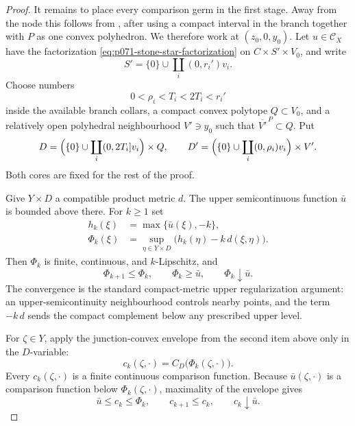 \begin{proof}
It remains to place every comparison germ in the first stage.  Away from
the node this follows from
, after using a compact interval
in the branch together with \(P\) as one convex polyhedron.  We therefore
work at \((z_0,0,y_0)\).  Let \(u\in\mathcal C_X\) have the factorization
\eqref{eq:p071-stone-star-factorization} on
\(C\times S'\times V_0\), and write
\[
                  S'=\{0\}\cup\coprod_i(0,r_i')v_i.
\]
Choose numbers
\[
                   0<\rho_i<T_i<2T_i<r_i'
\]
inside the available branch collars, a compact convex polytope
\(Q\subset V_0\), and a relatively open polyhedral neighbourhood
\(V'\ni y_0\) such that \(\overline{V'}^{\,P}\subset Q\).  Put
\begin{equation}
 D=\Bigl(\{0\}\cup\coprod_i(0,2T_i]v_i\Bigr)\times Q,
 \qquad
 D'=\Bigl(\{0\}\cup\coprod_i(0,\rho_i)v_i\Bigr)\times V'.
 \label{eq:p071-stone-star-nested-cores}
\end{equation}
Both cores are fixed for the rest of the proof.

Give \(Y\times D\) a compatible product metric \(d\).  The upper
semicontinuous function \(\bar u\) is bounded above there.  For \(k\geq1\)
set
\begin{align}
 h_k(\xi)&=\max\{\bar u(\xi),-k\},\\
 \Phi_k(\xi)&=\sup_{\eta\in Y\times D}
                 \bigl(h_k(\eta)-k\,d(\xi,\eta)\bigr).
 \label{eq:p071-stone-star-usc-regularization}
\end{align}
Then \(\Phi_k\) is finite, continuous, and \(k\)-Lipschitz, and
\begin{equation}
               \Phi_{k+1}\leq\Phi_k,
        \qquad \Phi_k\geq\bar u,
        \qquad \Phi_k\downarrow\bar u.
 \label{eq:p071-stone-star-usc-convergence}
\end{equation}
The convergence is the standard compact-metric upper regularization
argument: an upper-semicontinuity neighbourhood controls nearby points,
and the term \(-k\,d\) sends the compact complement below any prescribed
upper level.

For \(\zeta\in Y\), apply the junction-convex envelope from the second
item above only in the \(D\)-variable:
\begin{equation}
                    c_k(\zeta,\cdot)
          =C_D\bigl(\Phi_k(\zeta,\cdot)\bigr).
 \label{eq:p071-stone-star-fibre-envelope}
\end{equation}
Every \(c_k(\zeta,\cdot)\) is a finite continuous comparison function.
Because \(\bar u(\zeta,\cdot)\) is a comparison function below
\(\Phi_k(\zeta,\cdot)\), maximality of the envelope gives
\begin{equation}
       \bar u\leq c_k\leq\Phi_k,
       \qquad c_{k+1}\leq c_k,
       \qquad c_k\downarrow\bar u.
 \label{eq:p071-stone-star-envelope-convergence}
\end{equation}


\end{proof}
